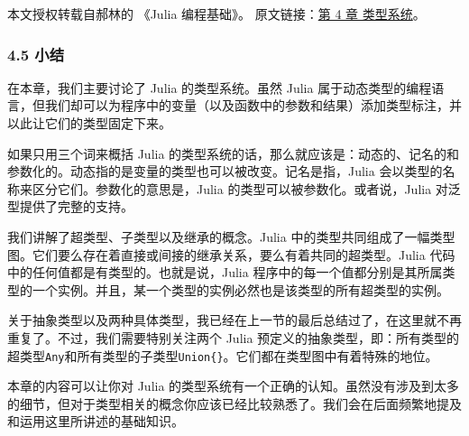 
本文授权转载自郝林的 《Julia 编程基础》。 原文链接：\href{https://github.com/hyper0x/JuliaBasics/blob/master/book/ch04.md}{第 4 章 类型系统}。


\subsubsection{4.5 小结}

在本章，我们主要讨论了 Julia 的类型系统。虽然 Julia 属于动态类型的编程语言，但我们却可以为程序中的变量（以及函数中的参数和结果）添加类型标注，并以此让它们的类型固定下来。

如果只用三个词来概括 Julia 的类型系统的话，那么就应该是：动态的、记名的和参数化的。动态指的是变量的类型也可以被改变。记名是指，Julia 会以类型的名称来区分它们。参数化的意思是，Julia 的类型可以被参数化。或者说，Julia 对泛型提供了完整的支持。

我们讲解了超类型、子类型以及继承的概念。Julia 中的类型共同组成了一幅类型图。它们要么存在着直接或间接的继承关系，要么有着共同的超类型。Julia 代码中的任何值都是有类型的。也就是说，Julia 程序中的每一个值都分别是其所属类型的一个实例。并且，某一个类型的实例必然也是该类型的所有超类型的实例。

关于抽象类型以及两种具体类型，我已经在上一节的最后总结过了，在这里就不再重复了。不过，我们需要特别关注两个 Julia 预定义的抽象类型，即：所有类型的超类型\verb`Any`和所有类型的子类型\verb`Union{}`。它们都在类型图中有着特殊的地位。

本章的内容可以让你对 Julia 的类型系统有一个正确的认知。虽然没有涉及到太多的细节，但对于类型相关的概念你应该已经比较熟悉了。我们会在后面频繁地提及和运用这里所讲述的基础知识。

